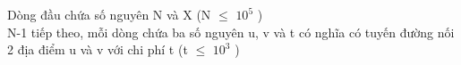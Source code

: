 Dòng đầu chứa số nguyên N và X (N  $\le$  $10^{5}$ )
\\N-1 tiếp theo, mỗi dòng chứa ba số nguyên u, v và t có nghĩa có tuyến đường nối 2 địa điểm u và v với chi phí t (t  $\le$  $10^{3}$ )
\\